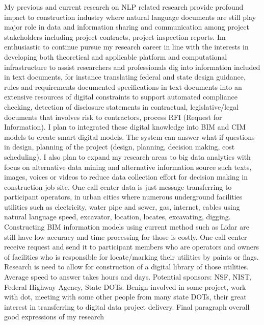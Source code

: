 \documentclass[a4paper,11pt]{article}
\begin{document}
My previous and current research on NLP related research provide profound impact to construction industry where natural language documents are still play major role in data and information sharing and communication among project stakeholders including project contracts, project inspection reports. Im enthusiastic to continue pursue my research career in line with the interests in developing both theoretical and applicable platform and computational infrastructure to assist researchers and professionals dig into information included in text documents, for instance translating federal and state design guidance, rules and requirements documented specifications in text documents into an extensive resources of digital constraints to support automated compliance checking, detection of disclosure statements in contractual, legislative/legal documents that involves risk to contractors, process RFI (Request for Information). I plan to integrated these digital knowledge into BIM and CIM models to create smart digital models. The system can answer what if questions in design, planning of the project (design, planning, decision making, cost scheduling).
%
I also plan to expand my research areas to big data analytics with focus on alternative data mining and alternative information source such texts, images, voices or videos to reduce data collection effort for decision making in construction job site. One-call center data is just message transferring to participant operators, in urban cities where numerous underground facilities utilities such as electricity, water pipe and sewer, gas, internet, cables using natural language speed, excavator, location, locates, excavating, digging. Constructing BIM information models using current method such as Lidar are still have low accuracy and time-processing for those is costly. One-call center receive request and send it to participant members who are operators and owners of facilities who is responsible for locate/marking their utilities by paints or flags. Research is need to allow for construction of a digital library of those utilities. Average speed to answer takes hours and days.
%
%
%
Potential sponsors: NSF, NIST, Federal Highway Agency, State DOTs. Benign involved in some project, work with dot, meeting with some other people from many state DOTs, their great interest in transferring to digital data project delivery.
%
Final paragraph  overall good expressions of my research
\end{document}
